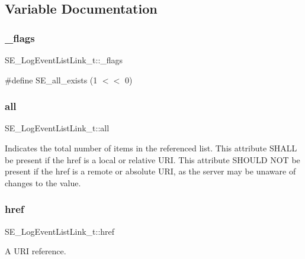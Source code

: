 \subsection{Variable Documentation}
\mbox{\label{group__LogEventListLink_gaa16e99e978e2b29da0be8ebc6f6996e4}} 
\subsubsection{\texorpdfstring{\+\_\+flags}{\_flags}}
{\footnotesize\ttfamily S\+E\+\_\+\+Log\+Event\+List\+Link\+\_\+t\+::\+\_\+flags}

\#define S\+E\+\_\+all\+\_\+exists (1 $<$$<$ 0) \mbox{\label{group__LogEventListLink_ga76f053623ed84ac7494426cdfa5b3cfe}} 
\subsubsection{\texorpdfstring{all}{all}}
{\footnotesize\ttfamily S\+E\+\_\+\+Log\+Event\+List\+Link\+\_\+t\+::all}

Indicates the total number of items in the referenced list. This attribute S\+H\+A\+LL be present if the href is a local or relative U\+RI. This attribute S\+H\+O\+U\+LD N\+OT be present if the href is a remote or absolute U\+RI, as the server may be unaware of changes to the value. \mbox{\label{group__LogEventListLink_ga24433e460b3ce5e3caec2498cb0c16e2}} 
\subsubsection{\texorpdfstring{href}{href}}
{\footnotesize\ttfamily S\+E\+\_\+\+Log\+Event\+List\+Link\+\_\+t\+::href}

A U\+RI reference. 